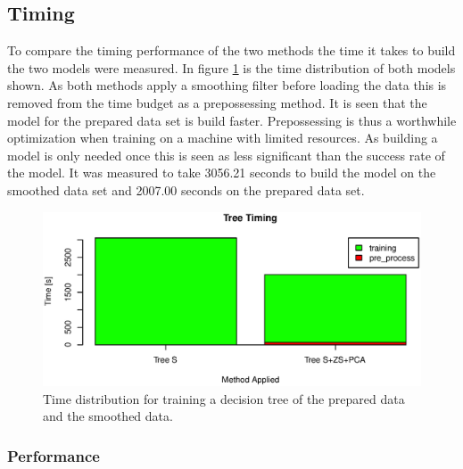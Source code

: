 
\subsection{Timing}
To compare the timing performance of the two methods the time it takes to build the two models were measured.
In figure \ref{fig:tree_time_distribution} is the time distribution of both models shown.
As both methods apply a smoothing filter before loading the data this is removed from the time budget as a prepossessing method.
It is seen that the model for the prepared data set is build faster.
Prepossessing is thus a worthwhile optimization when training on a machine with limited resources.
As building a model is only needed once this is seen as less significant than the success rate of the model.
It was measured to take 3056.21 seconds to build the model on the smoothed data set and 2007.00 seconds on the prepared data set.

\begin{figure}[h]
\centering
\includegraphics[width=\textwidth]{graphics/algo_compare_timing_tree}
\caption[Time distribution for decision tree.]{Time distribution for training a decision tree of the prepared data and the smoothed data.}
\label{fig:tree_time_distribution}
\end{figure}

\subsubsection{Performance}


